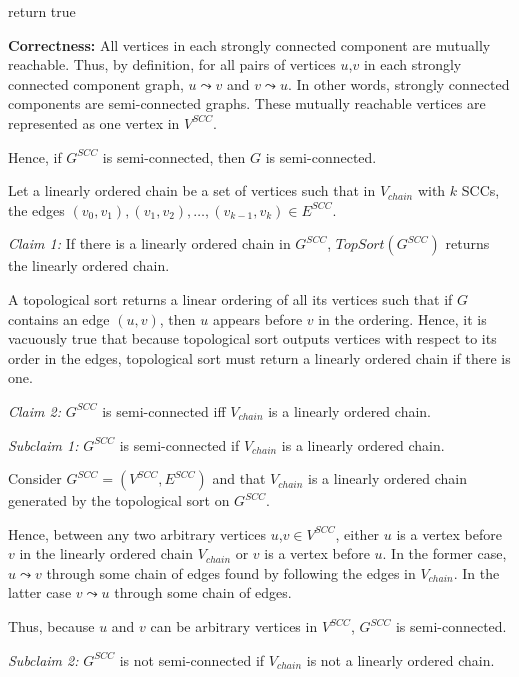 \documentclass[a4paper]{report}
\begin{document}
\begin{enumerate}
\begin{algorithmic}[1]
        \EndWhile
        \State return true
      \EndFunction
    \end{algorithmic}

      {\bf Correctness:}
      All vertices in each strongly connected component are mutually reachable. 
      Thus, by definition, for all pairs of vertices $u$,$v$ in each strongly connected component graph, $u \leadsto v$ and $v \leadsto u$. 
      In other words, strongly connected components are semi-connected graphs. 
      These mutually reachable vertices are represented as one vertex in $V^{SCC}$. 

      Hence, if $G^{SCC}$ is semi-connected, then $G$ is semi-connected. 
      
      Let a linearly ordered chain be a set of vertices such that in $V_{chain}$ with $k$ SCCs, the
      edges $(v_{0}, v_{1}), (v_{1},v_{2}),\dots,(v_{k-1},v_{k}) \in E^{SCC}$.

      {\it Claim 1:} If there is a linearly ordered chain in $G^{SCC}$, $TopSort(G^{SCC})$ returns the linearly ordered chain. 

      A topological sort returns a linear ordering of all its vertices such that if $G$ contains an edge $(u,v)$, then $u$
      appears before $v$ in the ordering. Hence, it is vacuously true that because topological sort outputs vertices with respect 
      to its order in the edges, topological sort must return a linearly ordered chain if there is one. 

      {\it Claim 2:} $G^{SCC}$ is semi-connected iff $V_{chain}$ is a linearly ordered chain. 

      {\it Subclaim 1:} $G^{SCC}$ is semi-connected if $V_{chain}$ is a linearly ordered chain. 

      Consider $G^{SCC}=(V^{SCC}, E^{SCC})$ and that $V_{chain}$ is a linearly ordered chain generated by the topological sort on $G^{SCC}$. 

      Hence, between any two arbitrary vertices $u$,$v \in V^{SCC}$, either $u$ is a vertex before $v$ in the linearly ordered chain $V_{chain}$ or
      $v$ is a vertex before $u$. In the former case, $u \leadsto v$ through some chain of edges found by following the edges in 
      $V_{chain}$. In the latter case $v \leadsto u$ through some chain of edges. 

      Thus, because $u$ and $v$ can be arbitrary vertices in $V^{SCC}$, $G^{SCC}$ is semi-connected. 


      {\it Subclaim 2:} $G^{SCC}$ is not semi-connected if $V_{chain}$ is not a linearly ordered chain. 


\end{enumerate}
\end{document}
